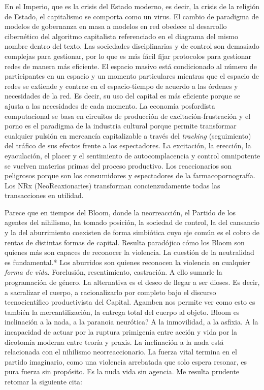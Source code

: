 En el Imperio, que es la crisis del Estado moderno, es decir, la crisis de la religión de Estado, el capitalismo se comporta como un virus. El cambio de paradigma de modelos de gobernanza en masa a modelos en red obedece al desarrollo cibernético del algoritmo capitalista referenciado en el diagrama del mismo nombre dentro del texto. Las sociedades disciplinarias y de control son demasiado complejas para gestionar, por lo que es más fácil fijar protocolos para gestionar redes de manera más eficiente. El espacio masivo está condicionado al número de participantes en un espacio y un momento particulares mientras que el espacio de redes se extiende y contrae en el espacio-tiempo de acuerdo a las órdenes y necesidades de la red. Es decir, su uso del capital es más eficiente porque se ajusta a las necesidades de cada momento. La economía posfordista computacional se basa en circuitos de producción de excitación-frustración y el porno es el paradigma de la industria cultural porque permite transformar cualquier pulsión en mercancía capitalizable a través del \emph{tracking} (seguimiento) del tráfico de sus efectos frente a los espectadores. La excitación, la erección, la eyaculación, el placer y el sentimiento de autocomplacencia y control omnipotente se vuelven materias primas del proceso productivo. Los reaccionarios son peligrosos porque son los consumidores y espectadores de la farmacopornografía. Los NRx (NeoReaxionaries) transforman concienzudamente todas las transacciones en utilidad.

Parece que en tiempos del Bloom, donde la neorreacción, el Partido de los agentes del nihilismo, ha tomado posición, la sociedad de control, la del cansancio y la del aburrimiento \autocite{orozcogaribaySociedadCansancioSociedad2015} coexisten de forma simbiótica cuyo eje común es el cobro de rentas de distintas formas de capital. Resulta paradójico cómo los Bloom son quienes más son capaces de reconocer la violencia. La cuestión de la neutralidad es fundamental.* Los aburridos son quienes reconocen la violencia en cualquier \emph{forma de vida}. Forclusión, resentimiento, castración. A ello sumarle la programación de género. La alternativa es el deseo de llegar a ser dioses. Es decir, a sacralizar el cuerpo, a racionalizarlo por completo bajo el discurso tecnocientífico productivista del Capital. Agamben nos permite ver como esto es también la mercantilización, la entrega total del cuerpo al objeto. Bloom es inclinación a la nada, a la paranoia neurótica? A la inmovilidad, a la asfixia. A la incapacidad de actuar por la ruptura primigenia entre acción y vida por la dicotomía moderna entre teoría y praxis. La inclinación a la nada está relacionada con el nihilismo neorreaccionario. La fuerza vital termina en el partido imaginario, como una violencia arrebatada que solo espera resonar, es pura fuerza sin propósito. Es la nuda vida sin agencia. Me resulta prudente retomar la siguiente cita:

